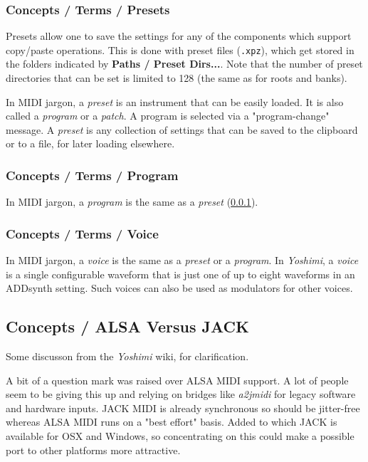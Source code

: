 \subsubsection{Concepts / Terms / Presets}
\label{subsubsec:concepts_terms_preset}

   Presets allow one to save the
   settings for any of the components which support copy/paste operations.
   This is done with preset files (\texttt{.xpz}), which get stored in the
   folders indicated by \textbf{Paths / Preset Dirs...}.
   Note that the number of preset directories that can be set is limited to 128
   (the same as for roots and banks).

   In MIDI jargon, a \textsl{preset} is an instrument that can be easily
   loaded.  It is also called a \textsl{program} or a \textsl{patch}.  A
   program is selected via a "program-change" message.  A
   \textsl{preset} is any collection of settings that can be saved to the
   clipboard or to a file, for later loading elsewhere.

\subsubsection{Concepts / Terms / Program}
\label{subsubsec:concepts_terms_program}

   In MIDI jargon, a \textsl{program} is the same as a \textsl{preset}
   (\ref{subsubsec:concepts_terms_preset}).

\subsubsection{Concepts / Terms / Voice}
\label{subsubsec:concepts_terms_voice}

   In MIDI jargon, a \textsl{voice} is the same as
   a \textsl{preset} or a \textsl{program}.
   In \textsl{Yoshimi}, a \textsl{voice} is a single configurable waveform
   that is just one of up to eight waveforms in an ADDsynth setting.
   Such voices can also be used as modulators for other voices.

\subsection{Concepts / ALSA Versus JACK}
\label{subsec:concepts_alsa_versus_jack}

   Some discusson from the \textsl{Yoshimi} wiki, for clarification.

   A bit of a question mark was raised over ALSA MIDI support. A lot of
   people seem to be giving this up and relying on bridges like
   \textsl{a2jmidi} for legacy software and hardware inputs. JACK MIDI is
   already synchronous so should be jitter-free whereas ALSA MIDI runs on a
   "best effort" basis. Added to which JACK is available for OSX and
   Windows, so concentrating on this could make a possible port to other
   platforms more attractive.

